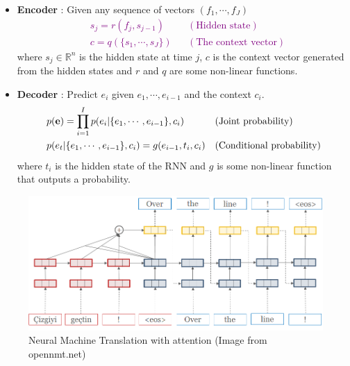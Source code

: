 \documentclass[landscape]{jhuslides3C}
\newcommand{\maths}[1]{\textcolor{purple}{#1}}
\begin{document}
\begin{itemize}
	\item \textbf{Encoder} : Given any sequence of vectors $(f_1,\cdots,f_J)$
	\maths{\begin{align*}
		& s_j = r(f_j, s_{j-1}) && (\text{Hidden state})\\
		& c = q(\{s_1,\cdots,s_J\}) && (\text{The context vector})
		\end{align*}}
		where $s_j \in \mathbb{R}^n$ is the hidden state at time $j$, $c$ is the context
		vector generated from the hidden states and $r$ and $q$ are some non-linear functions. 
	\item \textbf{Decoder} : Predict $e_i$ given $e_1 , \cdots , e_{i-1}$ and the context $c_i$.
	\maths{\begin{align*}
		& p({\bf e}) = \prod_{i=1}^{I} p(e_i | \{e_1 , \cdots , e_{i-1}\}, c_i) && (\text{Joint probability})\\
		& p(e_t | \{e_1 , \cdots , e_{i-1}\}, c_i) = g(e_{i-1}, t_i, c_i) && (\text{Conditional probability})
		\end{align*}}
		where $t_i$ is the hidden state of the RNN and $g$ is some non-linear 
		function that outputs a probability. 
\end{itemize}

\vspace{10mm}
\begin{figure}
\begin{center}
\includegraphics[scale=1]{images/simple-attn.png}
\caption{Neural Machine Translation with attention ({\tiny Image from opennmt.net})}
\end{center}
\end{figure}
\end{document}
